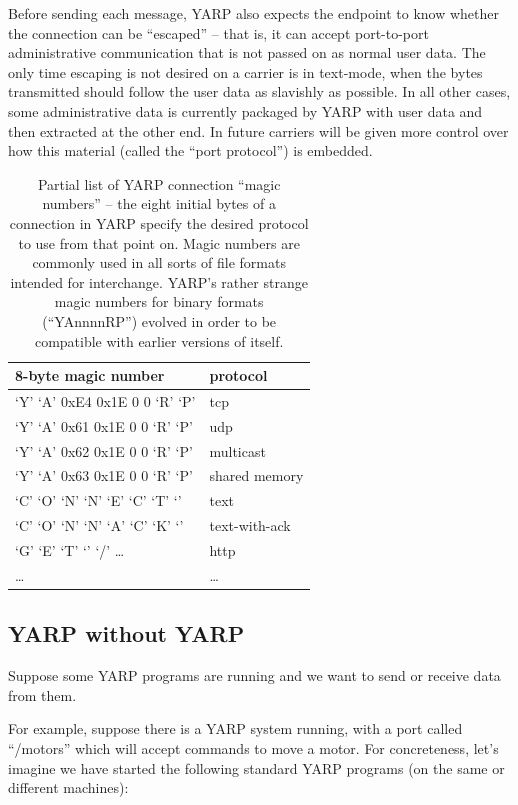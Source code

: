 Before sending each message, YARP also expects the endpoint to know
whether the connection can be ``escaped'' -- that is, it can accept
port-to-port administrative communication that is not passed on as
normal user data.  The only time escaping is not desired on a carrier
is in text-mode, when the bytes transmitted should follow the user
data as slavishly as possible.  In all other cases, some
administrative data is currently packaged by YARP with user data and
then extracted at the other end.  In future carriers will be given
more control over how this material (called the ``port protocol'') is
embedded.


\begin{table}
\begin{center}
\begin{tabular}{ll}
\hline
\hline
{\bf 8-byte magic number}&{\bf protocol} \\\hline
`Y' `A' 0xE4 0x1E 0 0 `R' `P'&tcp \\
`Y' `A' 0x61 0x1E 0 0 `R' `P'&udp\\
`Y' `A' 0x62 0x1E 0 0 `R' `P'&multicast\\
`Y' `A' 0x63 0x1E 0 0 `R' `P'&shared memory\\
`C' `O' `N' `N' `E' `C' `T' `\textvisiblespace' &text \\
`C' `O' `N' `N' `A' `C' `K' `\textvisiblespace' &text-with-ack \\
`G' `E' `T' `\textvisiblespace' `/' \ldots &http\\
  \ldots & \ldots\\\hline\hline
\end{tabular}
\end{center}
\caption{
%
Partial list of YARP connection ``magic numbers'' -- the eight initial
bytes of a connection in YARP specify the desired protocol to use from
that point on.  Magic numbers are commonly used in all sorts of file
formats intended for interchange.
YARP's rather strange magic numbers for binary formats (``YAnnnnRP'')
evolved in order to be compatible with earlier versions of itself.
%
}
\end{table}


\subsection{YARP without YARP}

Suppose some YARP programs are running and we want to send or
receive data from them.

For example, suppose there is a YARP system running, with a 
port called ``/motors'' which will accept commands to move a
motor.  For concreteness, let's imagine we have started the
following standard YARP programs (on the same or different 
machines):


